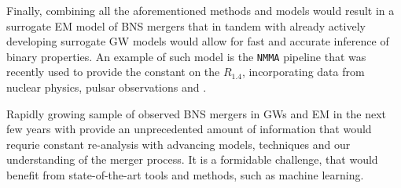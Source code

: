 Finally, 
combining all the aforementioned methods and models would result in a 
surrogate \ac{EM} model of \ac{BNS} mergers that in tandem with 
already actively developing surrogate \ac{GW} models would allow for 
fast and accurate inference of binary properties.
%
An example of such model is the \texttt{NMMA} pipeline \citep{Dietrich:2020efo} that 
was recently used to provide the constant on the $R_{1.4}$, incorporating data from 
nuclear physics, pulsar observations and \GW{}.

Rapidly growing sample of observed \ac{BNS} mergers in \acp{GW} and \ac{EM} in the next few 
years with provide an unprecedented amount of information that would requrie constant 
re-analysis with advancing models, techniques and our understanding of the merger process.
It is a formidable challenge, that would benefit from state-of-the-art tools and methods, 
such as machine learning. 
%


%
%
%
%
%
